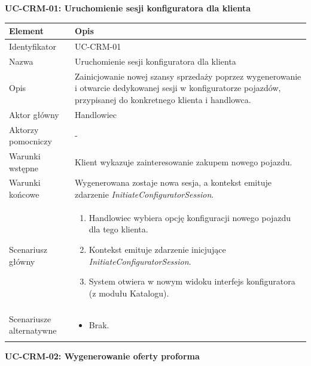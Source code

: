\textbf{UC-CRM-01: Uruchomienie sesji konfiguratora dla klienta}

\begin{longtable}{|p{4cm}|p{11cm}|}
\hline
\textbf{Element} & \textbf{Opis} \\
\hline

Identyfikator & UC-CRM-01 \\
\hline

Nazwa & Uruchomienie sesji konfiguratora dla klienta \\
\hline

Opis & 
Zainicjowanie nowej szansy sprzedaży poprzez wygenerowanie i otwarcie dedykowanej sesji w konfiguratorze pojazdów, przypisanej do konkretnego klienta i handlowca. \\
\hline

Aktor główny & Handlowiec \\
\hline

Aktorzy pomocniczy & - \\
\hline

Warunki wstępne & 
Klient wykazuje zainteresowanie zakupem nowego pojazdu. \\
\hline

Warunki końcowe & 
Wygenerowana zostaje nowa sesja, a kontekst emituje zdarzenie \textit{InitiateConfiguratorSession}. \\
\hline

Scenariusz główny & 
\begin{enumerate}
    \item Handlowiec wybiera opcję konfiguracji nowego pojazdu dla tego klienta.
    \item Kontekst emituje zdarzenie inicjujące \textit{InitiateConfiguratorSession}.
    \item System otwiera w nowym widoku interfejs konfiguratora (z modułu Katalogu).
\end{enumerate} \\
\hline

Scenariusze alternatywne & 
\begin{itemize}
    \item [] Brak.
\end{itemize} \\
\hline
\end{longtable}

\textbf{UC-CRM-02: Wygenerowanie oferty proforma}


